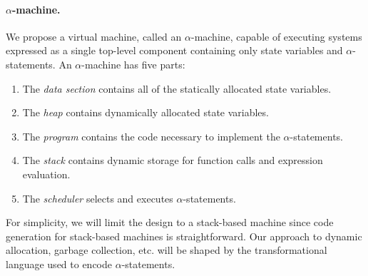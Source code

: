 \paragraph{$\alpha$-machine.}
We propose a virtual machine, called an $\alpha$-machine, capable of executing systems expressed as a single top-level component containing only state variables and $\alpha$-statements.
An $\alpha$-machine has five parts:
\begin{enumerate}
\item The \emph{data section} contains all of the statically allocated state variables.
\item The \emph{heap} contains dynamically allocated state variables.
\item The \emph{program} contains the code necessary to implement the $\alpha$-statements.
\item The \emph{stack} contains dynamic storage for function calls and expression evaluation.
\item The \emph{scheduler} selects and executes $\alpha$-statements.
\end{enumerate}
For simplicity, we will limit the design to a stack-based machine since code generation for stack-based machines is straightforward.
Our approach to dynamic allocation, garbage collection, etc. will be shaped by the transformational language used to encode $\alpha$-statements.



